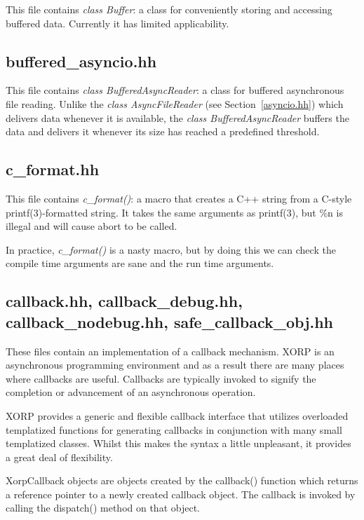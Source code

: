 \documentclass[11pt]{article}
\begin{document}
This file contains \emph{class Buffer}: a class for conveniently storing
and accessing buffered data.
Currently it has limited applicability.

\subsection{buffered\_asyncio.hh}

This file contains \emph{class BufferedAsyncReader}: a class for
buffered asynchronous file reading. Unlike the \emph{class AsyncFileReader}
(see Section~\ref{asyncio.hh}) which delivers data whenever it is available,
the \emph{class BufferedAsyncReader} buffers the data and delivers it
whenever its size has reached a predefined threshold.

\subsection{c\_format.hh}

This file contains \emph{c\_format()}: a macro that creates a C++ string
from a C-style printf(3)-formatted string.
It takes the same arguments as printf(3), but \%n is illegal and
will cause abort to be called.

In practice, \emph{c\_format()} is a nasty macro, but by doing this we can
check the compile time arguments are sane and the run time arguments.

\subsection{callback.hh, callback\_debug.hh, callback\_nodebug.hh,
 safe\_callback\_obj.hh}

These files contain an implementation of a callback mechanism.
XORP is an asynchronous programming environment and as a result there
are many places where callbacks are useful.  Callbacks are typically
invoked to signify the completion or advancement of an asynchronous
operation.

XORP provides a generic and flexible callback interface that utilizes
overloaded templatized functions for generating callbacks in
conjunction with many small templatized classes. Whilst this makes the
syntax a little unpleasant, it provides a great deal of flexibility.

XorpCallback objects are objects created by the callback()
function which returns a reference pointer to a newly created
callback object.  The callback is invoked by calling the dispatch()
method on that object.
\end{document}
